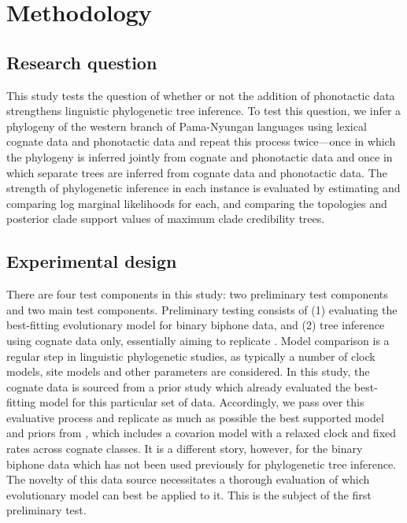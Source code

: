\hypertarget{pn-tree-methodology}{%
\section{Methodology}\label{pn-tree-methodology}}

\hypertarget{research-question}{%
\subsection{Research question}\label{research-question}}

This study tests the question of whether or not the addition of phonotactic data strengthens linguistic phylogenetic tree inference. To test this question, we infer a phylogeny of the western branch of Pama-Nyungan languages using lexical cognate data and phonotactic data and repeat this process twice---once in which the phylogeny is inferred jointly from cognate and phonotactic data and once in which separate trees are inferred from cognate data and phonotactic data. The strength of phylogenetic inference in each instance is evaluated by estimating and comparing log marginal likelihoods for each, and comparing the topologies and posterior clade support values of maximum clade credibility trees.

\hypertarget{experimental-design}{%
\subsection{Experimental design}\label{experimental-design}}

There are four test components in this study: two preliminary test components and two main test components. Preliminary testing consists of (1) evaluating the best-fitting evolutionary model for binary biphone data, and (2) tree inference using cognate data only, essentially aiming to replicate \textcite{bouckaert_origin_2018}. Model comparison is a regular step in linguistic phylogenetic studies, as typically a number of clock models, site models and other parameters are considered. In this study, the cognate data is sourced from a prior study \autocite{bouckaert_origin_2018} which already evaluated the best-fitting model for this particular set of data. Accordingly, we pass over this evaluative process and replicate as much as possible the best supported model and priors from \textcite{bouckaert_origin_2018}, which includes a covarion model with a relaxed clock and fixed rates across cognate classes. It is a different story, however, for the binary biphone data which has not been used previously for phylogenetic tree inference. The novelty of this data source necessitates a thorough evaluation of which evolutionary model can best be applied to it. This is the subject of the first preliminary test.

